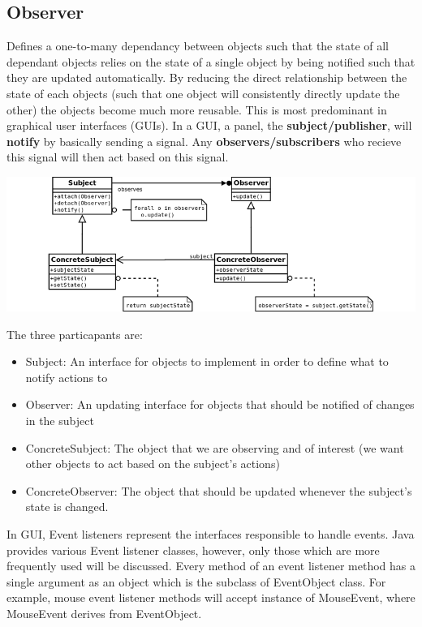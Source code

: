 \documentclass[a4paper, 11pt]{article}
\begin{document}
    \subsection{Observer}
        Defines a one-to-many dependancy between objects such that the state of all dependant objects relies on the state of a single object by being notified such that they are updated automatically.  By reducing the direct relationship between the state of each objects (such that one object will consistently directly update the other) the objects become much more reusable.  This is most predominant in graphical user interfaces (GUIs).  In a GUI, a panel, the \textbf{subject/publisher}, will \textbf{notify} by basically sending a signal.  Any \textbf{observers/subscribers} who recieve this signal will then act based on this signal.
        \begin{center}
            \includegraphics[scale=0.6]{observer}
        \end{center}
        The three particapants are:
        \begin{itemize}
            \item Subject: An interface for objects to implement in order to define what to notify actions to
            \item Observer: An updating interface for objects that should be notified of changes in the subject
            \item ConcreteSubject: The object that we are observing and of interest (we want other objects to act based on the subject's actions)
            \item ConcreteObserver: The object that should be updated whenever the subject's state is changed.
        \end{itemize}
        In GUI, Event listeners represent the interfaces responsible to handle events. Java provides various Event listener classes, however, only those which are more frequently used will be discussed. Every method of an event listener method has a single argument as an object which is the subclass of EventObject class. For example, mouse event listener methods will accept instance of MouseEvent, where MouseEvent derives from EventObject.
\end{document}
